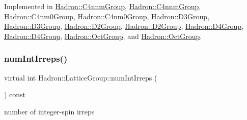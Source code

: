Implemented in \mbox{\hyperlink{structHadron_1_1C4nnmGroup_a38cf4c54a4dff0a3c056aa3a1dc4dca2}{Hadron\+::\+C4nnm\+Group}}, \mbox{\hyperlink{structHadron_1_1C4nnmGroup_a38cf4c54a4dff0a3c056aa3a1dc4dca2}{Hadron\+::\+C4nnm\+Group}}, \mbox{\hyperlink{structHadron_1_1C4nm0Group_ad38f333075aa53f1b0c7bded9f7e70ad}{Hadron\+::\+C4nm0\+Group}}, \mbox{\hyperlink{structHadron_1_1C4nm0Group_ad38f333075aa53f1b0c7bded9f7e70ad}{Hadron\+::\+C4nm0\+Group}}, \mbox{\hyperlink{structHadron_1_1D3Group_a33af6b6378351a7b023c23940c69403f}{Hadron\+::\+D3\+Group}}, \mbox{\hyperlink{structHadron_1_1D3Group_a33af6b6378351a7b023c23940c69403f}{Hadron\+::\+D3\+Group}}, \mbox{\hyperlink{structHadron_1_1D2Group_a1f8a4f5adef5a9a05edd39f14d21f1cd}{Hadron\+::\+D2\+Group}}, \mbox{\hyperlink{structHadron_1_1D2Group_a1f8a4f5adef5a9a05edd39f14d21f1cd}{Hadron\+::\+D2\+Group}}, \mbox{\hyperlink{structHadron_1_1D4Group_a97eed87299880400afc5e9bb1ee222bc}{Hadron\+::\+D4\+Group}}, \mbox{\hyperlink{structHadron_1_1D4Group_a97eed87299880400afc5e9bb1ee222bc}{Hadron\+::\+D4\+Group}}, \mbox{\hyperlink{structHadron_1_1OctGroup_a85ea73ed466c052783d454b14d5b30bc}{Hadron\+::\+Oct\+Group}}, and \mbox{\hyperlink{structHadron_1_1OctGroup_a85ea73ed466c052783d454b14d5b30bc}{Hadron\+::\+Oct\+Group}}.

\mbox{\label{structHadron_1_1LatticeGroup_af2aa7b39222bf188389356eefcef7547}} 
\subsubsection{\texorpdfstring{numIntIrreps()}{numIntIrreps()}\hspace{0.1cm}{\footnotesize\ttfamily [1/2]}}
{\footnotesize\ttfamily virtual int Hadron\+::\+Lattice\+Group\+::num\+Int\+Irreps (\begin{DoxyParamCaption}{ }\end{DoxyParamCaption}) const\hspace{0.3cm}{\ttfamily [pure virtual]}}

number of integer-\/spin irreps 

